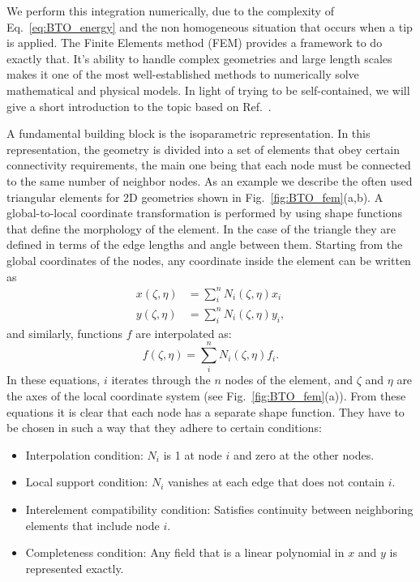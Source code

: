 We perform this integration numerically, due to the complexity of Eq.~\eqref{eq:BTO_energy} and the non homogeneous situation that occurs when a tip is applied.
The Finite Elements method (FEM) provides a framework to do exactly that.
It's ability to handle complex geometries and large length scales makes it one of the most well-established methods to numerically solve mathematical and physical models.
In light of trying to be self-contained, we will give a short introduction to the topic based on Ref.~\cite{Biner}.

A fundamental building block is the isoparametric representation.
In this representation, the geometry is divided into a set of elements that obey certain connectivity requirements, the main one being that each node must be connected to the same number of neighbor nodes.
As an example we describe the often used triangular elements for 2D geometries shown in Fig.~\ref{fig:BTO_fem}(a,b).
A global-to-local coordinate transformation is performed by using shape functions that define the morphology of the element.
In the case of the triangle they are defined in terms of the edge lengths and angle between them. 
Starting from the global coordinates of the nodes, any coordinate inside the element can be written as
\begin{align}
x(\zeta, \eta) &= \sum_i^n N_i(\zeta, \eta) x_i\\
y(\zeta, \eta) &= \sum_i^n N_i(\zeta, \eta) y_i,
\end{align}
and similarly, functions $f$ are interpolated as:
\begin{equation}
	\label{eq:BTO_funcinterp}
	f(\zeta, \eta) = \sum_i^n N_i(\zeta, \eta) f_i.
\end{equation}
In these equations, $i$ iterates through the $n$ nodes of the element, and $\zeta$ and $\eta$ are the axes of the local coordinate system (see Fig.~\ref{fig:BTO_fem}(a)).
From these equations it is clear that each node has a separate shape function.
They have to be chosen in such a way that they adhere to certain conditions:
\begin{itemize}
	\item Interpolation condition: $N_i$ is 1 at node $i$ and zero at the other nodes.
	\item Local support condition: $N_i$ vanishes at each edge that does not contain $i$.
	\item Interelement compatibility condition: Satisfies continuity between neighboring elements that include node $i$.
	\item Completeness condition: Any field that is a linear polynomial in $x$ and $y$ is represented exactly.
\end{itemize}

